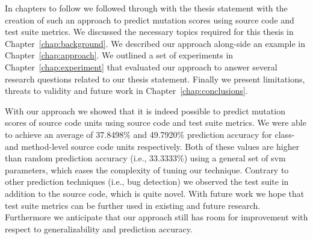 In chapters to follow we followed through with the thesis statement with the creation of such an approach to predict mutation scores using source code and test suite metrics. We discussed the necessary topics required for this thesis in Chapter~\ref{chap:background}. We described our approach along-side an example in Chapter~\ref{chap:approach}. We outlined a set of experiments in Chapter~\ref{chap:experiment} that evaluated our approach to answer several research questions related to our thesis statement. Finally we present limitations, threats to validity and future work in Chapter~\ref{chap:conclusions}.

With our approach we showed that it is indeed possible to predict mutation scores of source code units using source code and test suite metrics. We were able to achieve an average of 37.8498\% and 49.7920\% prediction accuracy for class- and method-level source code units respectively. Both of these values are higher than random prediction accuracy (i.e., 33.3333\%) using a general set of \gls{svm} parameters, which eases the complexity of tuning our technique. Contrary to other prediction techniques (i.e., bug detection) we observed the test suite in addition to the source code, which is quite novel. With future work we hope that test suite metrics can be further used in existing and future research. Furthermore we anticipate that our approach still has room for improvement with respect to generalizability and prediction accuracy.
